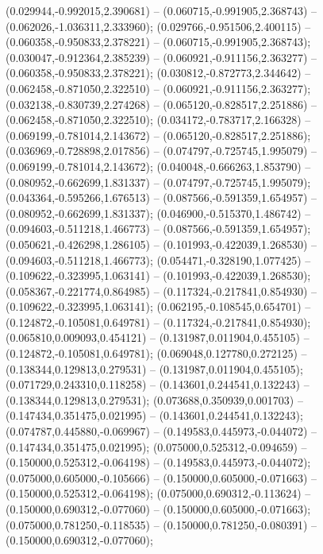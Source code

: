  (0.029944,-0.992015,2.390681) -- (0.060715,-0.991905,2.368743) -- (0.062026,-1.036311,2.333960);
 (0.029766,-0.951506,2.400115) -- (0.060358,-0.950833,2.378221) -- (0.060715,-0.991905,2.368743);
 (0.030047,-0.912364,2.385239) -- (0.060921,-0.911156,2.363277) -- (0.060358,-0.950833,2.378221);
 (0.030812,-0.872773,2.344642) -- (0.062458,-0.871050,2.322510) -- (0.060921,-0.911156,2.363277);
 (0.032138,-0.830739,2.274268) -- (0.065120,-0.828517,2.251886) -- (0.062458,-0.871050,2.322510);
 (0.034172,-0.783717,2.166328) -- (0.069199,-0.781014,2.143672) -- (0.065120,-0.828517,2.251886);
 (0.036969,-0.728898,2.017856) -- (0.074797,-0.725745,1.995079) -- (0.069199,-0.781014,2.143672);
 (0.040048,-0.666263,1.853790) -- (0.080952,-0.662699,1.831337) -- (0.074797,-0.725745,1.995079);
 (0.043364,-0.595266,1.676513) -- (0.087566,-0.591359,1.654957) -- (0.080952,-0.662699,1.831337);
 (0.046900,-0.515370,1.486742) -- (0.094603,-0.511218,1.466773) -- (0.087566,-0.591359,1.654957);
 (0.050621,-0.426298,1.286105) -- (0.101993,-0.422039,1.268530) -- (0.094603,-0.511218,1.466773);
 (0.054471,-0.328190,1.077425) -- (0.109622,-0.323995,1.063141) -- (0.101993,-0.422039,1.268530);
 (0.058367,-0.221774,0.864985) -- (0.117324,-0.217841,0.854930) -- (0.109622,-0.323995,1.063141);
 (0.062195,-0.108545,0.654701) -- (0.124872,-0.105081,0.649781) -- (0.117324,-0.217841,0.854930);
 (0.065810,0.009093,0.454121) -- (0.131987,0.011904,0.455105) -- (0.124872,-0.105081,0.649781);
 (0.069048,0.127780,0.272125) -- (0.138344,0.129813,0.279531) -- (0.131987,0.011904,0.455105);
 (0.071729,0.243310,0.118258) -- (0.143601,0.244541,0.132243) -- (0.138344,0.129813,0.279531);
 (0.073688,0.350939,0.001703) -- (0.147434,0.351475,0.021995) -- (0.143601,0.244541,0.132243);
 (0.074787,0.445880,-0.069967) -- (0.149583,0.445973,-0.044072) -- (0.147434,0.351475,0.021995);
 (0.075000,0.525312,-0.094659) -- (0.150000,0.525312,-0.064198) -- (0.149583,0.445973,-0.044072);
 (0.075000,0.605000,-0.105666) -- (0.150000,0.605000,-0.071663) -- (0.150000,0.525312,-0.064198);
 (0.075000,0.690312,-0.113624) -- (0.150000,0.690312,-0.077060) -- (0.150000,0.605000,-0.071663);
 (0.075000,0.781250,-0.118535) -- (0.150000,0.781250,-0.080391) -- (0.150000,0.690312,-0.077060);
